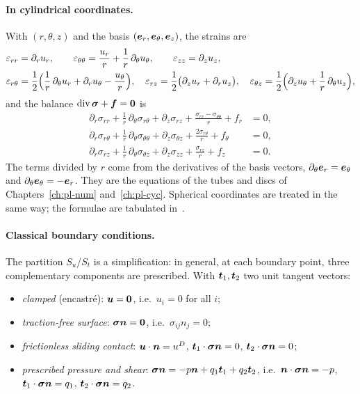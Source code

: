 \paragraph{In cylindrical coordinates.}
%
With $(r,\theta,z)$ and the basis $(\bm{e}_r,\bm{e}_\theta,\bm{e}_z)$, the strains are
\begin{align*}
  &\varepsilon_{rr}=\partial_ru_r,\qquad
  \varepsilon_{\theta\theta}=\frac{u_r}r+\frac1r\,\partial_\theta u_\theta,\qquad
  \varepsilon_{zz}=\partial_zu_z,\\
  &\varepsilon_{r\theta}=\frac12\Bigl(\frac1r\,\partial_\theta u_r+\partial_ru_\theta-\frac{u_\theta}r\Bigr),\quad
  \varepsilon_{rz}=\frac12\bigl(\partial_zu_r+\partial_ru_z\bigr),\quad
  \varepsilon_{\theta z}=\frac12\Bigl(\partial_zu_\theta+\frac1r\,\partial_\theta u_z\Bigr),
\end{align*}
and the balance $\operatorname{div}\bm{\sigma}+\bm{f}=\bm{0}$ is
\begin{align*}
  \partial_r\sigma_{rr}+\frac1r\,\partial_\theta\sigma_{r\theta}+\partial_z\sigma_{rz}
  +\frac{\sigma_{rr}-\sigma_{\theta\theta}}r+f_r&=0,\\
  \partial_r\sigma_{r\theta}+\frac1r\,\partial_\theta\sigma_{\theta\theta}+\partial_z\sigma_{\theta z}
  +\frac{2\sigma_{r\theta}}r+f_\theta&=0,\\
  \partial_r\sigma_{rz}+\frac1r\,\partial_\theta\sigma_{\theta z}+\partial_z\sigma_{zz}
  +\frac{\sigma_{rz}}r+f_z&=0 .
\end{align*}
The terms divided by $r$ come from the derivatives of the basis vectors,
$\partial_\theta\bm{e}_r=\bm{e}_\theta$ and $\partial_\theta\bm{e}_\theta=-\bm{e}_r$. They are the
equations of the tubes and discs of Chapters~\ref{ch:pl-num}
and~\ref{ch:pl-cyc}. Spherical coordinates are treated in the same way; the
formulae are tabulated in~\cite{Salencon2001}.

\paragraph{Classical boundary conditions.} The partition $S_u$/$S_t$ is a
%
simplification: in general, at each boundary point, three complementary
components are prescribed. With $\bm{t}_1,\bm{t}_2$ two unit tangent vectors:
\begin{itemize}
  \item \emph{clamped} (encastr\'e): $\bm{u}=\bm{0}$, i.e.\ $u_i=0$ for all $i$;
  \item \emph{traction-free surface}: $\bm{\sigma}\bm{n}=\bm{0}$, i.e.\ $\sigma_{ij}n_j=0$;
  \item \emph{frictionless sliding contact}: $\bm{u}\cdot\bm{n}=u^D$,
  $\bm{t}_1\cdot\bm{\sigma}\bm{n}=0$, $\bm{t}_2\cdot\bm{\sigma}\bm{n}=0$;
  \item \emph{prescribed pressure and shear}: $\bm{\sigma}\bm{n}=-p\bm{n}+q_1\bm{t}_1+q_2\bm{t}_2$,
  i.e.\ $\bm{n}\cdot\bm{\sigma}\bm{n}=-p$, $\bm{t}_1\cdot\bm{\sigma}\bm{n}=q_1$, $\bm{t}_2\cdot\bm{\sigma}\bm{n}=q_2$.
\end{itemize}


